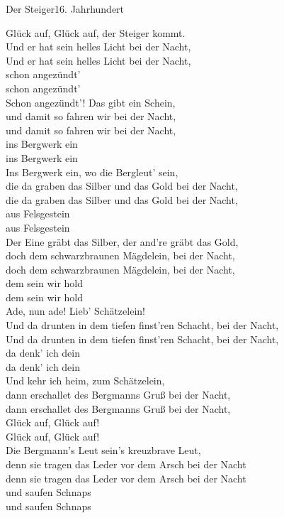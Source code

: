
\begin{lied}{Der Steiger}{16. Jahrhundert}

Glück auf, Glück auf, der Steiger kommt.\\
Und er hat sein helles Licht bei der Nacht,\\
Und er hat sein helles Licht bei der Nacht,\\
schon angezündt’\\
schon angezündt’\\

Schon angezündt’! Das gibt ein Schein,\\
und damit so fahren wir bei der Nacht,\\
und damit so fahren wir bei der Nacht,\\
ins Bergwerk ein\\
ins Bergwerk ein\\

Ins Bergwerk ein, wo die Bergleut’ sein,\\
die da graben das Silber und das Gold bei der Nacht,\\
die da graben das Silber und das Gold bei der Nacht,\\
aus Felsgestein\\
aus Felsgestein\\

Der Eine gräbt das Silber, der and're gräbt das Gold,\\
doch dem schwarzbraunen Mägdelein, bei der Nacht,\\
doch dem schwarzbraunen Mägdelein, bei der Nacht,\\
dem sein wir hold\\
dem sein wir hold\\

Ade, nun ade! Lieb’ Schätzelein!\\
Und da drunten in dem tiefen finst’ren Schacht, bei der Nacht,\\
Und da drunten in dem tiefen finst’ren Schacht, bei der Nacht,\\
da denk’ ich dein\\
da denk’ ich dein\\

Und kehr ich heim, zum Schätzelein,\\
dann erschallet des Bergmanns Gruß bei der Nacht,\\
dann erschallet des Bergmanns Gruß bei der Nacht,\\
Glück auf, Glück auf!\\
Glück auf, Glück auf!\\

Die Bergmann’s Leut sein’s kreuzbrave Leut,\\
denn sie tragen das Leder vor dem Arsch bei der Nacht\\
denn sie tragen das Leder vor dem Arsch bei der Nacht\\
und saufen Schnaps\\
und saufen Schnaps\\
\end{lied}
